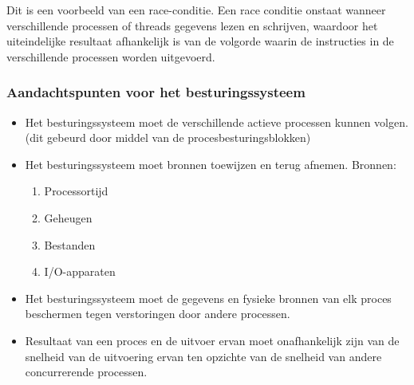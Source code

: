 Dit is een voorbeeld van een race-conditie. Een race conditie onstaat wanneer verschillende processen of threads gegevens lezen en schrijven, waardoor het uiteindelijke resultaat afhankelijk is van de volgorde waarin de instructies in de verschillende processen worden uitgevoerd.


\newpage


\subsubsection{Aandachtspunten voor het besturingssysteem}

\begin{itemize}
    \item Het besturingssysteem moet de verschillende actieve processen kunnen volgen. (dit gebeurd door middel van de procesbesturingsblokken)
    \item 	Het besturingssysteem moet bronnen toewijzen en terug afnemen. Bronnen:
        \begin{enumerate}
        \item Processortijd
        \item Geheugen
        \item Bestanden
        \item I/O-apparaten
        \end{enumerate}
    \item Het besturingssysteem moet de gegevens en fysieke bronnen van elk proces beschermen tegen verstoringen door andere processen.
    \item Resultaat van een proces en de uitvoer ervan moet onafhankelijk zijn van de snelheid van de uitvoering ervan ten opzichte van de snelheid van andere concurrerende processen.

\end{itemize}

